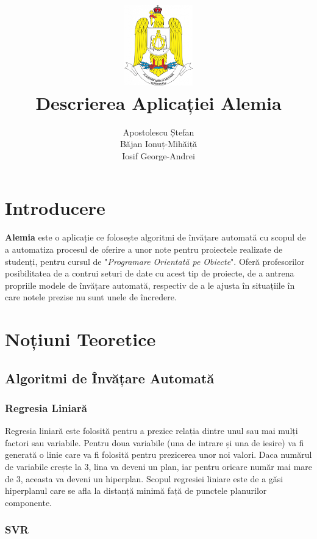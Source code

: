 \documentclass{article}
\title{
    \includegraphics[width=3cm, height=3.5cm]{images/ATM.png} \\
    \vspace{5mm}
    Descrierea Aplicației \textbf{Alemia}
    \vspace{10mm}
}
\author{
    Apostolescu Ștefan \\
    Băjan Ionuț-Mihăiță \\
    Iosif George-Andrei \\
    \vspace{10mm}
}
\begin{document}
\null
\nointerlineskip 
\vfill
\let\snewpage \newpage
\let\newpage \relax
\clearpage\maketitle
\thispagestyle{empty}
\let \newpage \snewpage
\vfill 
\break

\newpage

\setcounter{page}{1}
\tableofcontents

\newpage

\section{Introducere}

\textbf{Alemia} este o aplicație ce folosește algoritmi de învățare automată cu scopul de a automatiza procesul de oferire a unor note pentru proiectele realizate de studenți, pentru cursul de "\textit{Programare Orientată pe Obiecte}". Oferă profesorilor posibilitatea de a contrui seturi de date cu acest tip de proiecte, de a antrena propriile modele de învățare automată, respectiv de a le ajusta în situațiile în care notele prezise nu sunt unele de încredere.

\section{Noțiuni Teoretice}

\subsection{Algoritmi de Învățare Automată}

\subsubsection{Regresia Liniară}

Regresia liniară este folosită pentru a prezice relația dintre unul sau mai mulți factori sau variabile. Pentru doua variabile (una de intrare și una de iesire) va fi generată o linie care va fi folosită pentru prezicerea unor noi valori. Daca numărul de variabile crește la 3, lina va deveni un plan, iar pentru oricare număr mai mare de 3, aceasta va deveni un hiperplan. Scopul regresiei liniare este de a găsi hiperplanul care se afla la distanță minimă față de punctele planurilor componente.

\subsubsection{SVR}
\end{document}

